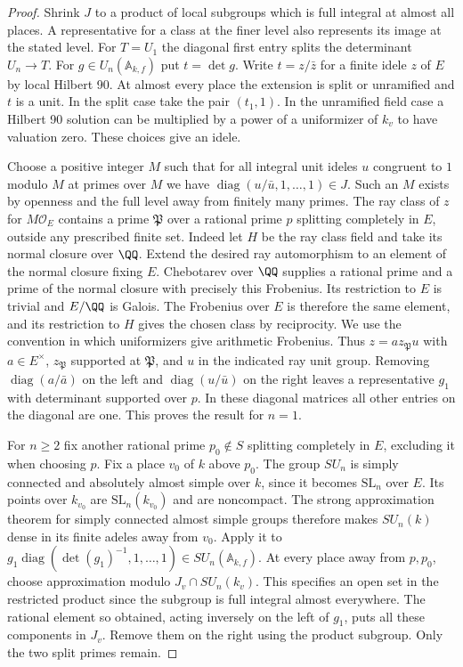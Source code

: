 \documentclass[a4paper,11pt]{article}
\theoremstyle{definition}
\theoremstyle{remark}
\numberwithin{equation}{section}
\newcommand{\OO}{\mathcal O}
\begin{document}
\begin{proof}
Shrink \(J\) to a product of local subgroups which is full integral
at almost all places. A representative for a class at the finer
level also represents its image at the stated level. For \(T=U_1\)
the diagonal first entry splits the determinant \(U_n\to T\).
For \(g\in U_n(\mathbb A_{k,f})\) put \(t=\det g\). Write
\(t=z/\bar z\) for a finite idele \(z\) of \(E\) by local Hilbert
90. At almost every place the extension is split or unramified
and \(t\) is a unit. In the split case take the pair \((t_1,1)\).
In the unramified field case a Hilbert 90 solution can be
multiplied by a power of a uniformizer of \(k_v\) to have valuation
zero. These choices give an idele.

Choose a positive integer \(M\) such that for all integral unit
ideles \(u\) congruent to \(1\) modulo \(M\) at primes over \(M\)
we have \(\operatorname{diag}(u/\bar u,1,\ldots,1)\in J\).
Such an \(M\) exists by openness and the full level away from
finitely many primes. The ray class of \(z\) for \(M\OO_E\)
contains a prime \(\mathfrak P\) over a rational prime \(p\)
splitting completely in \(E\), outside any prescribed finite set.
Indeed let \(H\) be the ray class field and take its normal closure
over \(\QQ\). Extend the desired ray automorphism to an element of
the normal closure fixing \(E\). Chebotarev over \(\QQ\) supplies
a rational prime and a prime of the normal closure with precisely
this Frobenius. Its restriction to \(E\) is trivial and \(E/\QQ\)
is Galois. The Frobenius over \(E\) is therefore the same element,
and its restriction to \(H\) gives the chosen class by reciprocity.
We use the convention in which uniformizers give arithmetic
Frobenius. Thus \(z=a z_{\mathfrak P}u\) with \(a\in E^\times\),
\(z_{\mathfrak P}\) supported at \(\mathfrak P\), and \(u\) in
the indicated ray unit group. Removing \(\operatorname{diag}(a/\bar a)\)
on the left and \(\operatorname{diag}(u/\bar u)\) on the right
leaves a representative \(g_1\) with determinant supported over
\(p\). In these diagonal matrices all other entries on the
diagonal are one. This proves the result for \(n=1\).

For \(n\ge2\) fix another rational prime \(p_0\notin S\)
splitting completely in \(E\), excluding it when choosing \(p\).
Fix a place \(v_0\) of \(k\) above \(p_0\).
The group \(SU_n\) is simply connected and absolutely almost
simple over \(k\), since it becomes \(\mathrm{SL}_n\) over \(E\).
Its points over \(k_{v_0}\) are \(\mathrm{SL}_n(k_{v_0})\)
and are noncompact. The strong approximation theorem for simply
connected almost simple groups therefore makes \(SU_n(k)\) dense
in its finite adeles away from \(v_0\). Apply it to
\(g_1\operatorname{diag}(\det(g_1)^{-1},1,\ldots,1)\in
SU_n(\mathbb A_{k,f})\). At every place away from \(p,p_0\),
choose approximation modulo \(J_v\cap SU_n(k_v)\).
This specifies an open set in the restricted product since
the subgroup is full integral almost everywhere. The rational
element so obtained, acting inversely on the left of \(g_1\),
puts all these components in \(J_v\). Remove them on the right
using the product subgroup. Only the two split primes remain.
\end{proof}
\end{document}
